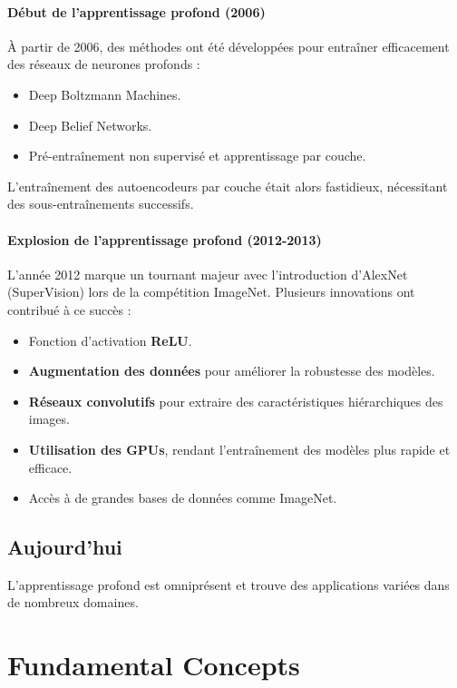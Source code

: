 \documentclass{article}
\begin{document}
\paragraph{Début de l'apprentissage profond (2006)}
À partir de 2006, des méthodes ont été développées pour entraîner efficacement des réseaux de neurones profonds :
\begin{itemize}
    \item Deep Boltzmann Machines.
    \item Deep Belief Networks.
    \item Pré-entraînement non supervisé et apprentissage par couche.
\end{itemize}
L'entraînement des autoencodeurs par couche était alors fastidieux, nécessitant des sous-entraînements successifs.

\paragraph{Explosion de l'apprentissage profond (2012-2013)}
L'année 2012 marque un tournant majeur avec l'introduction d'AlexNet (SuperVision) lors de la compétition ImageNet. Plusieurs innovations ont contribué à ce succès :
\begin{itemize}
    \item Fonction d'activation \textbf{ReLU}.
    \item \textbf{Augmentation des données} pour améliorer la robustesse des modèles.
    \item \textbf{Réseaux convolutifs} pour extraire des caractéristiques hiérarchiques des images.
    \item \textbf{Utilisation des GPUs}, rendant l'entraînement des modèles plus rapide et efficace.
    \item Accès à de grandes bases de données comme ImageNet.
\end{itemize}

\subsection*{Aujourd'hui}
L'apprentissage profond est omniprésent et trouve des applications variées dans de nombreux domaines.

\clearpage\newpage

\section{Fundamental Concepts}
\end{document}
